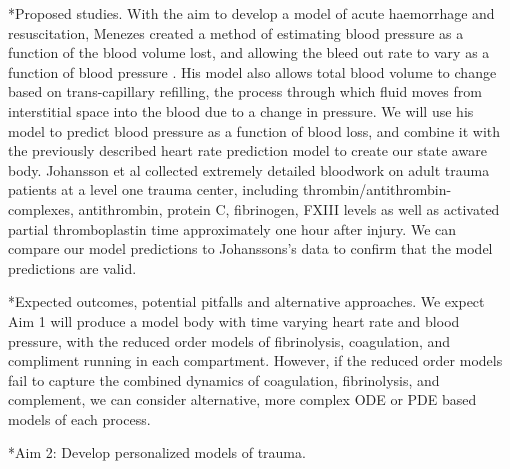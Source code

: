 \documentclass[11pt]{article}
\makeatletter
\renewcommand\subsection{\@startsection
	{subsection}{2}{0mm}
	{-0.05in}
	{-0.5\baselineskip}
	{\normalfont\normalsize\bfseries}}
\renewcommand\subsubsection{\@startsection
	{subsubsection}{2}{0mm}
	{-0.05in}
	{-0.5\baselineskip}
	{\normalfont\normalsize\bfseries}}
\renewcommand\paragraph{\@startsection
  {paragraph}{2}{0mm}
  {-0.05in}
  {-0.5\baselineskip}
  {\normalfont\normalsize\itshape}}
\makeatother
\begin{document}
\subsubsection*{Proposed studies.}
With the aim to develop a model of acute haemorrhage and resuscitation, Menezes created a method of estimating blood pressure as a function of the blood volume lost, and allowing the bleed out rate to vary as a function of blood pressure  \citep{menezes1998computer}. His model also allows total blood volume to change based on trans-capillary refilling, the process through which fluid moves from interstitial space into the blood due to a change in pressure. We will use his model to predict blood pressure as a function of blood loss, and combine it with the previously described heart rate prediction model to create our state aware body. Johansson et al collected extremely detailed bloodwork on adult trauma patients at a level one trauma center, including thrombin/antithrombin-complexes, antithrombin, protein C, fibrinogen, FXIII levels as well as activated partial thromboplastin time \citep{johansson2011disseminated} approximately one hour after injury. We can compare our model predictions to Johanssons's data to confirm that the model predictions are valid. 

\paragraph*{Expected outcomes, potential pitfalls and alternative approaches.}
We expect Aim 1 will produce  a model body with time varying heart rate and blood pressure, with the reduced order models of fibrinolysis, coagulation, and compliment running in each compartment. However, if the reduced order models fail to capture the combined dynamics of coagulation, fibrinolysis, and complement, we can consider alternative, more complex ODE or PDE based models of each process. 

\subsection*{Aim 2: Develop personalized models of trauma. }
\end{document}
